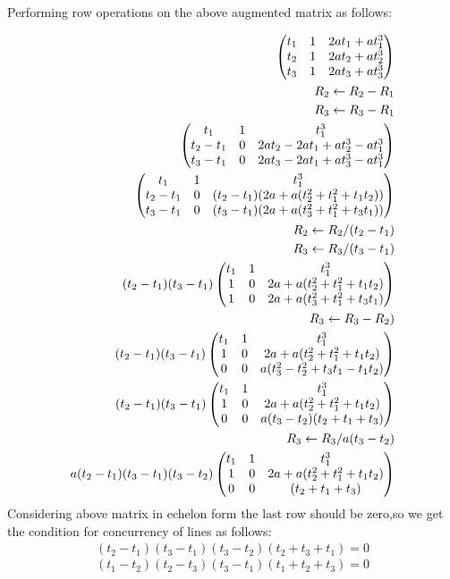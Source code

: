 \documentclass[journal,12pt,twocolumn]{IEEEtran}
\begin{document}
Performing row operations on the above augmented matrix as follows:

\begin{align}
\begin{split}
\begin{pmatrix}
t_1&1&2at_1+at_1^3\\t_2&1&2at_2+at_2^3\\t_3&1&2at_3+at_3^3
\end{pmatrix}\\
R_2 \leftarrow {R_2-R_1}\\R_3 \leftarrow {R_3-R_1}\\
\begin{pmatrix}t_1&1&t_1^3\\t_2-t_1&0&2at_2-2at_1+at_2^3-at_1^3\\t_3-t_1&0&2at_3-2at_1+at_3^3-at_1^3\end{pmatrix}\\
\begin{pmatrix}t_1&1&t_1^3\\t_2-t_1&0&(t_2-t_1)(2a+a(t_2^2+t_1^2+t_1t_2))\\t_3-t_1&0&(t_3-t_1)(2a+a(t_3^2+t_1^2+t_3t_1))\end{pmatrix}\\
R_2 \leftarrow {R_2/(t_2-t_1)}\\R_3 \leftarrow {R_3/(t_3-t_1)}\\
(t_2-t_1)(t_3-t_1)\begin{pmatrix}t_1&1&t_1^3\\1&0&2a+a(t_2^2+t_1^2+t_1t_2)\\1&0&2a+a(t_3^2+t_1^2+t_3t_1)\end{pmatrix}\\
R_3 \leftarrow {R_3-R_2)}\\
(t_2-t_1)(t_3-t_1)\begin{pmatrix}t_1&1&t_1^3\\1&0&2a+a(t_2^2+t_1^2+t_1t_2)\\0&0&a(t_3^2-t_2^2+t_3t_1-t_1t_2)\end{pmatrix}\\
(t_2-t_1)(t_3-t_1)\begin{pmatrix}t_1&1&t_1^3\\1&0&2a+a(t_2^2+t_1^2+t_1t_2)\\0&0&a(t_3-t_2)(t_2+t_1+t_3)\end{pmatrix}\\
R_3 \leftarrow {R_3/a(t_3-t_2)}\\
a(t_2-t_1)(t_3-t_1)(t_3-t_2)\begin{pmatrix}t_1&1&t_1^3\\1&0&2a+a(t_2^2+t_1^2+t_1t_2)\\0&0&(t_2+t_1+t_3)\end{pmatrix}\\
\end{split}
\end{align}
Considering above matrix in echelon form the last row should be zero,so we get the condition for concurrency of lines as follows:
\begin{equation}
\begin{split}
(t_2-t_1)(t_3-t_1)(t_3-t_2)(t_2+t_3+t_1)=0
\end{split}
\end{equation}
\begin{equation}
(t_1-t_2)(t_2-t_3)(t_3-t_1)(t_1+t_2+t_3)=0
\label{eq:1}
\end{equation}
\end{document}
